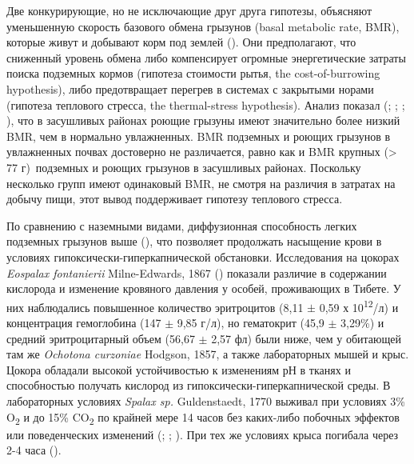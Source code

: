 

Две конкурирующие, но не исключающие друг друга гипотезы, объясняют уменьшенную скорость базового обмена грызунов (basal metabolic rate, BMR), которые живут и добывают корм под землей (\cite{White2003}). Они предполагают, что сниженный уровень обмена либо компенсирует огромные энергетические затраты поиска подземных кормов (гипотеза стоимости рытья, the cost-of-burrowing hypothesis), либо предотвращает перегрев в системах с закрытыми норами (гипотеза теплового стресса, the thermal-stress hypothesis). Анализ показал (\cite{White2003}; \cite{McNab1966}; \cite{Vleck1979}; \cite{Gorecki1969}), что в засушливых районах роющие грызуны имеют значительно более низкий BMR, чем в нормально увлажненных. BMR подземных и роющих грызунов в увлажненных почвах достоверно не различается, равно как и BMR крупных (> 77 г) подземных и роющих грызунов в засушливых районах. Поскольку несколько групп имеют одинаковый BMR, не смотря на различия в затратах на добычу пищи, этот вывод поддерживает гипотезу теплового стресса. 



По сравнению с наземными видами, диффузионная способность легких подземных грызунов выше (\cite{Widmer1997}), что позволяет продолжать насыщение крови в условиях гипоксически-гиперкапнической обстановки. Исследования на цокорах \textit{Eospalax fontanierii} Milne-Edwards, 1867 (\cite{Wei2006}) показали различие в содержании кислорода и изменение кровяного давления у особей, проживающих в Тибете. У них наблюдались повышенное количество эритроцитов (8,11 $\pm$ 0,59 х 10\textsuperscript{12}/л) и концентрация гемоглобина (147 $\pm$ 9,85 г/л), но гематокрит (45,9 $\pm$ 3,29\%) и средний эритроцитарный объем (56,67 $\pm$ 2,57 фл) были ниже, чем у обитающей там же \textit{Ochotona curzoniae} Hodgson, 1857, а также лабораторных мышей и крыс. Цокора обладали высокой устойчивостью к изменениям рН в тканях и способностью получать кислород из гипоксически-гиперкапнической среды. В лабораторных условиях \textit{Spalax sp.} Guldenstaedt, 1770 выживал при условиях 3\% O\textsubscript{2} и до 15\% CO\textsubscript{2} по крайней мере 14 часов без каких-либо побочных эффектов или поведенческих изменений (\cite{Avivi1999}; \cite{Shams2005a}; \cite{Shams2005}). При тех же условиях крыса погибала через 2-4 часа (\cite{Avivi1999}). 

